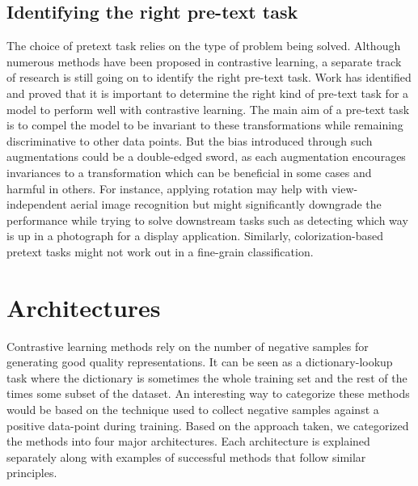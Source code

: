 \documentclass[conference]{IEEEtran}
\begin{document}
\subsection{Identifying the right pre-text task}
The choice of pretext task relies on the type of problem being solved. Although numerous methods have been proposed in contrastive learning, a separate track of research is still going on to identify the right pre-text task.
Work has identified and proved that it is important to determine the right kind of pre-text task for a model to perform well with contrastive learning.
The main aim of a pre-text task is to compel the model to be invariant to these transformations while remaining discriminative to other data points.
But the bias introduced through such augmentations could be a double-edged sword, as each augmentation encourages invariances to a transformation which can be beneficial in some cases and harmful in others.
For instance, applying rotation may help with view-independent aerial image recognition but might significantly downgrade the performance while trying to solve downstream tasks such as detecting which way is up in a photograph for a display application.
Similarly, colorization-based pretext tasks might not work out in a fine-grain classification.

\section{Architectures}
Contrastive learning methods rely on the number of negative samples for generating good quality representations. It can be seen as a dictionary-lookup task where the dictionary is sometimes the whole training set and the rest of the times some subset of the dataset.
An interesting way to categorize these methods would be based on the technique used to collect negative samples against a positive data-point during training. Based on the approach taken, we categorized the methods into four major architectures. Each architecture is explained separately along with examples of successful methods that follow similar principles.
\end{document}
